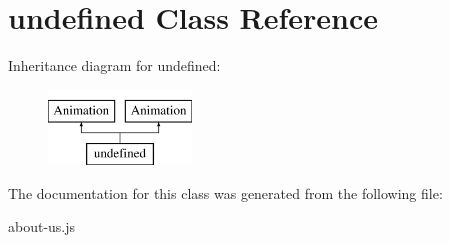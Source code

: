 \hypertarget{classundefined}{\section{undefined Class Reference}
\label{classundefined}
}
Inheritance diagram for undefined\-:\begin{figure}[H]
\begin{center}
\leavevmode
\includegraphics[height=2.000000cm]{classundefined}
\end{center}
\end{figure}


The documentation for this class was generated from the following file\-:\begin{DoxyCompactItemize}
\item 
about-\/us.\-js\end{DoxyCompactItemize}
